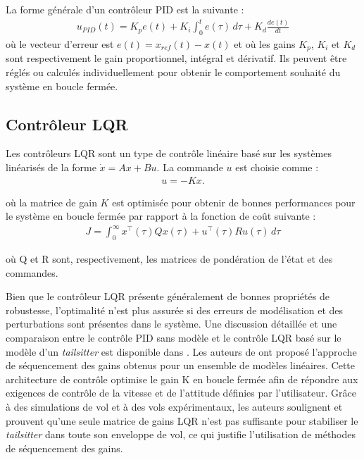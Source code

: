 La forme générale d'un contrôleur PID est la suivante :
\begin{align}
    u_{PID}(t) = K_{p} e(t) + K_{i} \int_{0}^{t} e(\tau) \,d\tau + K_{d} \frac{d e(t)}{dt}
\end{align}
où le vecteur d'erreur est $e(t) = x_{ref} (t) - x(t)$ et où les gains $K_{p}$, $K_{i}$ et $K_{d}$ sont respectivement le gain proportionnel, intégral et dérivatif. Ils peuvent être réglés ou calculés individuellement pour obtenir le comportement souhaité du système en boucle fermée.

\subsection*{Contrôleur LQR}
\label{sec:LQR}
Les contrôleurs LQR sont un type de contrôle linéaire basé sur les systèmes linéarisés de la forme $\dot{x} = Ax+Bu$. La commande $u$ est
choisie comme :
\begin{align*}
    u = -Kx.
\end{align*}

où la matrice de gain $K$ est optimisée pour obtenir de bonnes performances pour le système en boucle fermée par rapport à la fonction de coût suivante :
\begin{align*}
    J = \int_{0}^{\infty} x^{\top}(\tau)Q x(\tau) + u^{\top}(\tau)R u(\tau) \,d\tau
\end{align*}

où Q et R sont, respectivement, les matrices de pondération de l'état et des commandes. 

Bien que le contrôleur LQR présente généralement de bonnes propriétés de robustesse, l'optimalité n'est plus assurée si des erreurs de modélisation et des perturbations sont présentes dans le système. Une discussion détaillée et une comparaison entre le contrôle PID sans modèle et le contrôle LQR basé sur le modèle d'un \textit{tailsitter} est disponible dans \cite{BarthCondomines2018}.
Les auteurs de \cite{Lustosa2017LaP} ont proposé l'approche de séquencement des gains obtenus pour un ensemble de modèles linéaires. Cette architecture de contrôle optimise le gain K en boucle fermée afin de répondre aux exigences de contrôle de la vitesse et de l'attitude définies par l'utilisateur. Grâce à des simulations de vol et à des vols expérimentaux, les auteurs soulignent et prouvent qu'une seule matrice de gains LQR n'est pas suffisante pour stabiliser le \textit{tailsitter} dans toute son enveloppe de vol, ce qui justifie l'utilisation de méthodes de séquencement des gains.

